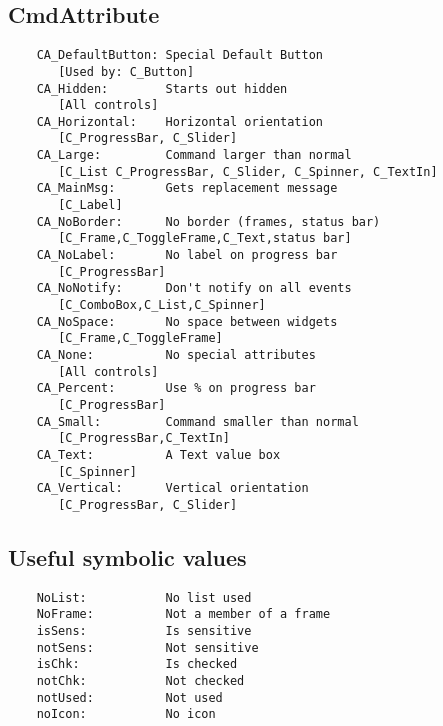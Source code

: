 \subsection*{CmdAttribute}

\footnotesize
\begin{verbatim}
    CA_DefaultButton: Special Default Button
       [Used by: C_Button]
    CA_Hidden:        Starts out hidden
       [All controls]
    CA_Horizontal:    Horizontal orientation
       [C_ProgressBar, C_Slider]
    CA_Large:         Command larger than normal
       [C_List C_ProgressBar, C_Slider, C_Spinner, C_TextIn]
    CA_MainMsg:       Gets replacement message
       [C_Label]
    CA_NoBorder:      No border (frames, status bar)
       [C_Frame,C_ToggleFrame,C_Text,status bar]
    CA_NoLabel:       No label on progress bar
       [C_ProgressBar]
    CA_NoNotify:      Don't notify on all events
       [C_ComboBox,C_List,C_Spinner]
    CA_NoSpace:       No space between widgets
       [C_Frame,C_ToggleFrame]
    CA_None:          No special attributes
       [All controls]
    CA_Percent:       Use % on progress bar
       [C_ProgressBar]
    CA_Small:         Command smaller than normal
       [C_ProgressBar,C_TextIn]
    CA_Text:          A Text value box
       [C_Spinner]
    CA_Vertical:      Vertical orientation
       [C_ProgressBar, C_Slider]
\end{verbatim}
\normalfont\normalsize

\subsection*{Useful symbolic values}

\footnotesize
\begin{verbatim}
    NoList:           No list used
    NoFrame:          Not a member of a frame
    isSens:           Is sensitive
    notSens:          Not sensitive
    isChk:            Is checked
    notChk:           Not checked
    notUsed:          Not used
    noIcon:           No icon
\end{verbatim}
\normalfont\normalsize


